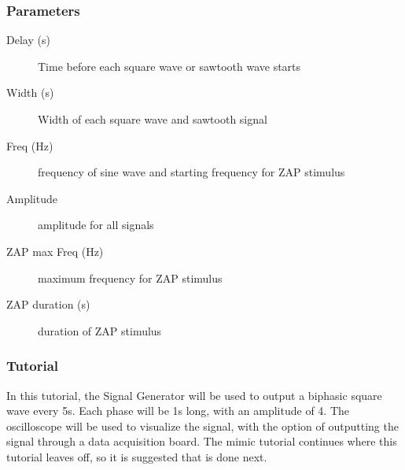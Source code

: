 \subsubsection{Parameters}
\begin{description}
\item [Delay (s)]Time before each square wave or sawtooth wave starts
\item [Width (s)]Width of each square wave and sawtooth signal
\item [Freq (Hz)]frequency of sine wave and starting frequency for ZAP stimulus
\item [Amplitude]amplitude for all signals
\item [ZAP max Freq (Hz)]maximum frequency for ZAP stimulus
\item [ZAP duration (s)]duration of ZAP stimulus
\end{description}

\subsubsection{Tutorial}
\label{siggen tutorial}
In this tutorial, the Signal Generator will be used to output a biphasic square wave every 5s. Each phase will be 1s long, with an amplitude of 4. The oscilloscope will be used to visualize the signal, with the option of outputting the signal through a data acquisition board. The mimic tutorial continues where this tutorial leaves off, so it is suggested that is done next.

